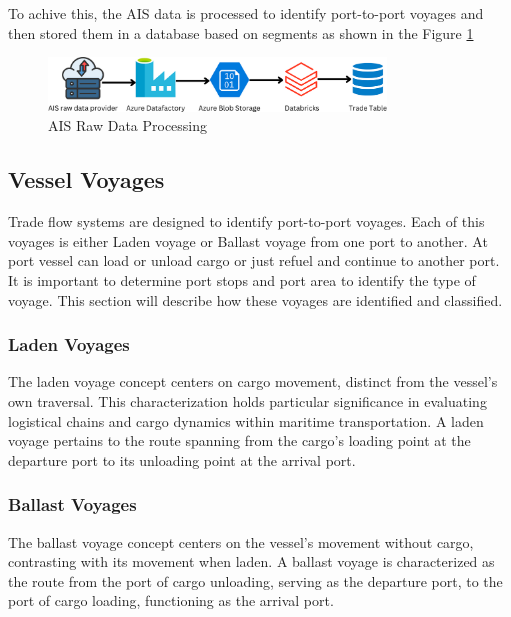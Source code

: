 To achive this, the AIS data is processed to identify port-to-port voyages and then stored them in a database based on segments as shown in the Figure \ref{ais_processing}

\begin{figure}[h]
    \centering
    \includegraphics[width=0.8\textwidth]{images/ais_processing.png}
    \caption{AIS Raw Data Processing}
    \label{ais_processing}
\end{figure}

\subsection{Vessel Voyages}

Trade flow systems are designed to identify port-to-port voyages. 
Each of this voyages is either Laden voyage or Ballast voyage from one port to another. 
At port vessel can load or unload cargo or just refuel and continue to another port.
It is important to determine port stops and port area to identify the type of voyage.
This section will describe how these voyages are identified and classified. 


\subsubsection{Laden Voyages}

The laden voyage concept centers on cargo movement, distinct from the vessel's own traversal. 
This characterization holds particular significance in evaluating logistical chains and cargo dynamics within maritime transportation. 
A laden voyage pertains to the route spanning from the cargo's loading point at the departure port to its unloading point at the arrival port. 


\subsubsection{Ballast Voyages}

The ballast voyage concept centers on the vessel's movement without cargo, contrasting with its movement when laden. 
A ballast voyage is characterized as the route from the port of cargo unloading, serving as the departure port, to the port of cargo loading, functioning as the arrival port.

